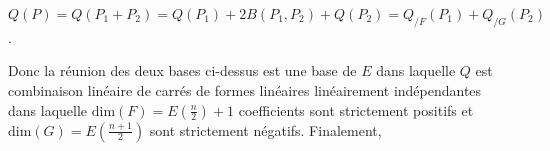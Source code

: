 {\begin{enumerate}
{\begin{center}
$Q(P)=Q(P_1+P_2) =Q(P_1)+2B(P_1,P_2)+Q(P_2) = Q_{/F}(P_1)+Q_{/G}(P_2)$.
\end{center}

Donc la réunion des deux bases ci-dessus est une base de $E$ dans laquelle $Q$ est combinaison linéaire de carrés de formes linéaires linéairement indépendantes dans laquelle $\text{dim}(F)=E\left(\frac{n}{2}\right)+1$ coefficients sont strictement positifs et 
$\text{dim}(G)=E\left(\frac{n+1}{2}\right)$ sont strictement négatifs. Finalement,

\begin{center}

\end{center}}
\end{enumerate}
}
